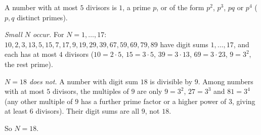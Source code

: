 A number with at most $5$ divisors is $1$, a prime $p$, or of the form $p^2$, $p^3$, $pq$ or $p^4$ ($p,q$ distinct primes).

\emph{Small $N$ occur.} For $N=1,\dots,17$: $10,2,3,13,5,15,7,17,9,19,29,39,67,59,69,79,89$ have digit sums $1,\dots,17$, and each has at most $4$ divisors ($10=2\cdot5$, $15=3\cdot5$, $39=3\cdot13$, $69=3\cdot23$, $9=3^2$, the rest prime).

\emph{$N=18$ does not.} A number with digit sum $18$ is divisible by $9$. Among numbers with at most $5$ divisors, the multiples of $9$ are only $9=3^2$, $27=3^3$ and $81=3^4$ (any other multiple of $9$ has a further prime factor or a higher power of $3$, giving at least $6$ divisors). Their digit sums are all $9$, not $18$.

So $N=\boxed{18}$.
